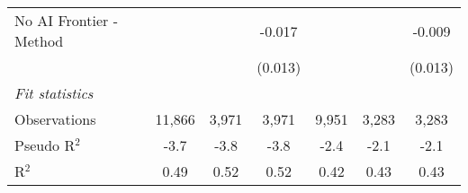 \begin{tabular}{lcccccc}
   No AI Frontier - Method &               &              & -0.017       &               &              & -0.009\\   
                           &               &              & (0.013)      &               &              & (0.013)\\   
   \midrule
   \emph{Fit statistics}\\
   Observations            & 11,866        & 3,971        & 3,971        & 9,951         & 3,283        & 3,283\\  
   Pseudo R$^2$            & -3.7          & -3.8         & -3.8         & -2.4          & -2.1         & -2.1\\  
   R$^2$                   & 0.49          & 0.52         & 0.52         & 0.42          & 0.43         & 0.43\\  
   

\end{tabular}
